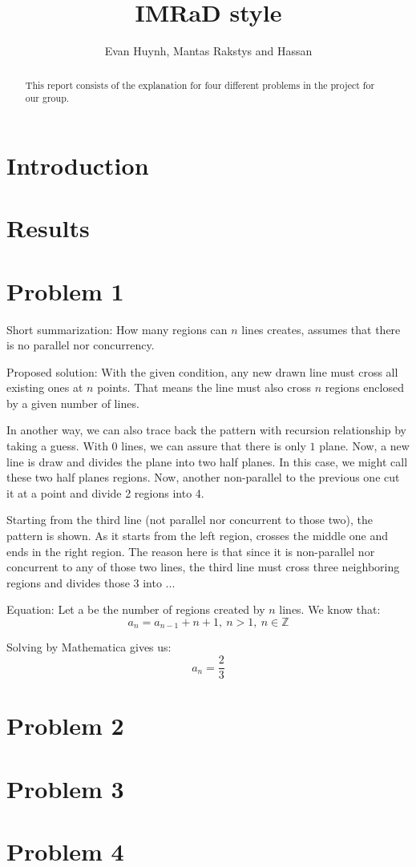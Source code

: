 \documentclass[11pt,a4paper]{article}
\begin{document}
\title{IMRaD style}
\author{Evan Huynh, Mantas Rakstys and Hassan}

\maketitle

\begin{abstract}
 This report consists of the explanation for four different problems in the project for our group.
\end{abstract}

\tableofcontents

\section{Introduction}

\section{Results}
\section{Problem 1}
Short summarization: How many regions can \(n\) lines creates, assumes that there is no parallel nor concurrency.

Proposed solution: With the given condition, any new drawn line must cross all existing ones at \(n\) points. That means the line must also cross \(n\) regions enclosed by a given number of lines.

In another way, we can also trace back the pattern with recursion relationship by taking a guess. With \(0\) lines, we can assure that there is only \(1\) plane. Now, a new line is draw and divides the plane into two half planes. In this case, we might call these two half planes regions. Now, another non-parallel to the previous one cut it at a point and divide 2 regions into 4. 

Starting from the third line (not parallel nor concurrent to those two), the pattern is shown. As it starts from the left region, crosses the middle one and ends in the right region. The reason here is that since it is non-parallel nor concurrent to any of those two lines, the third line must cross three neighboring regions and divides those 3 into ... %

Equation: Let a be the number of regions created by \(n\) lines. We know that:
\[a_{n} = a_{n-1} + n + 1, \ n>1, \ n \in \mathds{Z} \]

Solving by Mathematica gives us: 
\[a_{n} = \frac{2}{3}\]

\section{Problem 2}

\section{Problem 3}

\section{Problem 4}

\begin{thebibliography}{99}
 
\end{thebibliography}
\end{document}
